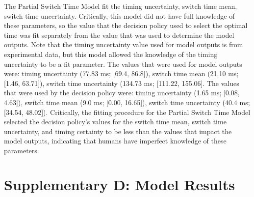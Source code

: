 \documentclass[12pt]{article}
\begin{document}
The Partial Switch Time Model fit the timing uncertainty, switch time mean, switch time uncertainty. Critically, this model did not have full knowledge of these parameters, so the value that the decision policy used to select the optimal time was fit separately from the value that was used to determine the model outputs. Note that the timing uncertainty value used for model outputs is from experimental data, but this model allowed the knowledge of the timing uncertainty to be a fit parameter. The values that were used for model outputs were: timing uncertainty (77.83 ms; [69.4, 86.8]), switch time mean (21.10 ms; [1.46, 63.71]), switch time uncertainty (134.73 ms; [111.22, 155.06]. The values that were used by the decision policy were: timing uncertainty (1.65 ms;  [0.08, 4.63]), switch time mean (9.0 ms; [0.00, 16.65]), switch time uncertainty (40.4 ms; [34.54, 48.02]). Critically, the fitting procedure for the Partial Switch Time Model selected the decision policy’s values for the switch time mean, switch time uncertainty, and timing certainty to be less than the values that impact the model outputs, indicating that  humans have imperfect knowledge of these parameters.

\newpage
\section{Supplementary D: Model Results}
\end{document}
